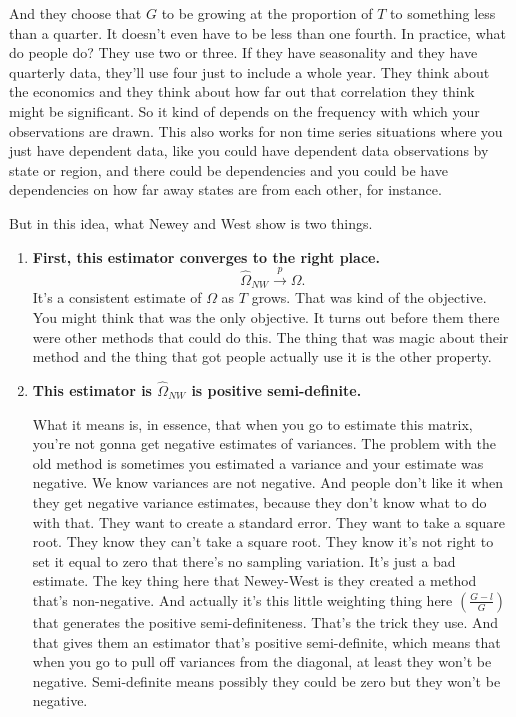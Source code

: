 \documentclass[11pt,a4paper]{amsart}
\theoremstyle{plain}
\theoremstyle{definition}
\begin{document}
     	   And they choose that $G$ to be growing at the proportion of $T$  to something less than a quarter. It doesn't even have to be less than one fourth. In practice, what do people do? They use two or three. If they have seasonality and they have quarterly data, they'll use four just to include a whole year. They think about the economics and they think about how far out that correlation they think might be significant. So it kind of depends on the frequency with which your observations are drawn. This also works for non time series situations where you just have dependent data, like you could have dependent data observations by state or region, and there could be dependencies and you could be have dependencies on how far away states are from each other, for instance.\par 
     	   But in this idea, what Newey and West show is two things.\par 
			\begin{enumerate}
				\item  \textbf{First, this estimator converges to the right place.}
				\[	\hat{\Omega}_{NW} \stackrel{p}{\longrightarrow} \Omega.	\]
				It's a consistent estimate of $\Omega$ as $T$ grows. That was kind of the objective. You might think that was the only objective. It turns out before them there were other methods that could do this. The thing that was magic about their method and the thing that got people actually use it is the other property. 
				\item \textbf{This estimator is $\hat{\Omega}_{NW}$ is positive semi-definite.}\par 
				What it means is, in essence, that when you go to estimate this matrix, you're not gonna get negative estimates of variances. The problem with the old method is sometimes you estimated a variance and your estimate was negative. We know variances are not negative. And people don't like it when they get negative variance estimates, because they don't know what to do with that. They want to create a standard error. They want to take a square root. They know they can't take a square root. They know it's not right to set it equal to zero that there's no sampling variation. It's just a bad estimate. The key thing here that Newey-West is they created a method that's non-negative.  And actually it's this little weighting thing here $(\frac{G-l}{G})$ that generates the positive semi-definiteness. That's the trick they use. And that gives them an estimator that's positive semi-definite, which means that when you go to pull off variances from the diagonal, at least they won't be negative. Semi-definite means possibly they could be zero but they won't be negative.
			\end{enumerate}
\end{document}
